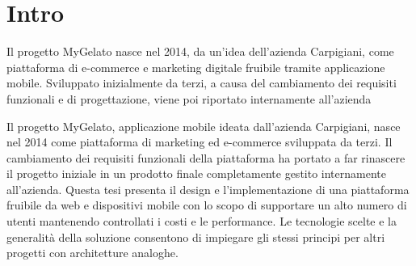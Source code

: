 \section*{Intro}
Il progetto MyGelato nasce nel 2014, da un'idea dell'azienda Carpigiani, come piattaforma di e-commerce e marketing digitale fruibile tramite applicazione mobile.
Sviluppato inizialmente da terzi, a causa del cambiamento dei requisiti funzionali e di progettazione, viene poi riportato internamente all'azienda  



Il progetto MyGelato, applicazione mobile ideata dall’azienda Carpigiani,
nasce nel 2014 come piattaforma di marketing ed e-commerce
sviluppata da terzi. Il cambiamento dei requisiti funzionali della
piattaforma ha portato a far rinascere il progetto iniziale in un prodotto
finale completamente gestito internamente all’azienda.
Questa tesi presenta il design e l’implementazione di una piattaforma
fruibile da web e dispositivi mobile con lo scopo di supportare un alto
numero di utenti mantenendo controllati i costi e le performance.
Le tecnologie scelte e la generalità della soluzione consentono di
impiegare gli stessi principi per altri progetti con architetture analoghe.
\newpage